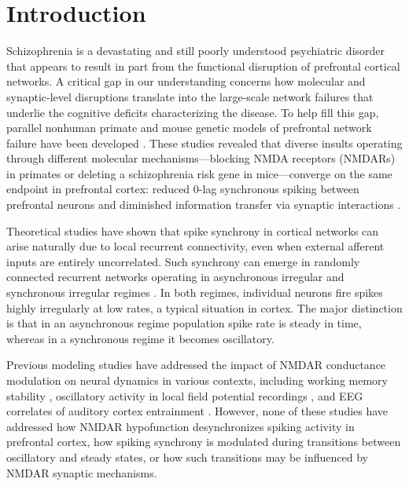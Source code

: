 \documentclass[12pt]{article}
\begin{document}
\section{Introduction}

Schizophrenia is a devastating and still poorly understood psychiatric disorder \citep{Insel2010, Jauhar2022} that appears to result in part from the functional disruption of prefrontal cortical networks. A critical gap in our understanding concerns how molecular and synaptic-level disruptions translate into the large-scale network failures that underlie the cognitive deficits characterizing the disease. To help fill this gap, parallel nonhuman primate and mouse genetic models of prefrontal network failure have been developed \citep{Kummerfeld2020, Zick2018, Zick2021}. These studies revealed that diverse insults operating through different molecular mechanisms---blocking NMDA receptors (NMDARs) in primates or deleting a schizophrenia risk gene in mice---converge on the same endpoint in prefrontal cortex: reduced 0-lag synchronous spiking between prefrontal neurons and diminished information transfer via synaptic interactions \citep{Kummerfeld2020, Zick2021, Zick2018}.

Theoretical studies have shown that spike synchrony in cortical networks can arise naturally due to local recurrent connectivity, even when external afferent inputs are entirely uncorrelated. Such synchrony can emerge in randomly connected recurrent networks operating in asynchronous irregular \citep{Amit1989, AmitBrunel1997, Brunel2000, Renart2010, vanVreeswijk1996, Vicente2008} and synchronous irregular regimes \citep{Brunel2000, BrunelHakim1999, BrunelWang2003, Ledoux2011}. In both regimes, individual neurons fire spikes highly irregularly at low rates, a typical situation in cortex. The major distinction is that in an asynchronous regime population spike rate is steady in time, whereas in a synchronous regime it becomes oscillatory.

Previous modeling studies have addressed the impact of NMDAR conductance modulation on neural dynamics in various contexts, including working memory stability \citep{Compte2000, Wang1999}, oscillatory activity in local field potential recordings \citep{BrunelWang2003}, and EEG correlates of auditory cortex entrainment \citep{Kirli2014}. However, none of these studies have addressed how NMDAR hypofunction desynchronizes spiking activity in prefrontal cortex, how spiking synchrony is modulated during transitions between oscillatory and steady states, or how such transitions may be influenced by NMDAR synaptic mechanisms.
\end{document}
